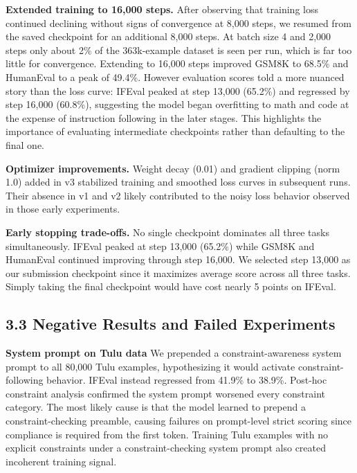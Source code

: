 \documentclass[10pt,letterpaper]{article}
\begin{document}
\textbf{Extended training to 16,000 steps.} After observing that training loss 
continued declining without signs of convergence at 8,000 steps, we resumed from the 
saved checkpoint for an additional 8,000 steps. At batch size 4 and 2,000 steps only 
about 2\% of the 363k-example dataset is seen per run, which is far too little for 
convergence. Extending to 16,000 steps improved GSM8K to 68.5\% and HumanEval to a 
peak of 49.4\%. However evaluation scores told a more nuanced story than the loss 
curve: IFEval peaked at step 13,000 (65.2\%) and regressed by step 16,000 (60.8\%), 
suggesting the model began overfitting to math and code at the expense of instruction 
following in the later stages. This highlights the importance of evaluating 
intermediate checkpoints rather than defaulting to the final one.

\textbf{Optimizer improvements.} Weight decay (0.01) and gradient clipping (norm 1.0) 
added in v3 stabilized training and smoothed loss curves in subsequent runs. Their 
absence in v1 and v2 likely contributed to the noisy loss behavior observed in those 
early experiments.

\textbf{Early stopping trade-offs.} No single checkpoint dominates all three tasks 
simultaneously. IFEval peaked at step 13,000 (65.2\%) while GSM8K and HumanEval 
continued improving through step 16,000. We selected step 13,000 as our submission 
checkpoint since it maximizes average score across all three tasks. Simply taking the 
final checkpoint would have cost nearly 5 points on IFEval.

\subsection{3.3 Negative Results and Failed Experiments}

\textbf{System prompt on Tulu data} We prepended a constraint-awareness 
system prompt to all 80,000 Tulu examples, hypothesizing it would activate 
constraint-following behavior. IFEval instead regressed from 41.9\% to 38.9\%. 
Post-hoc constraint analysis confirmed the system prompt worsened every constraint 
category. The most likely cause is that the model learned to prepend a 
constraint-checking preamble, causing failures on prompt-level strict scoring since 
compliance is required from the first token. Training Tulu examples with no explicit 
constraints under a constraint-checking system prompt also created incoherent training 
signal.
\end{document}
